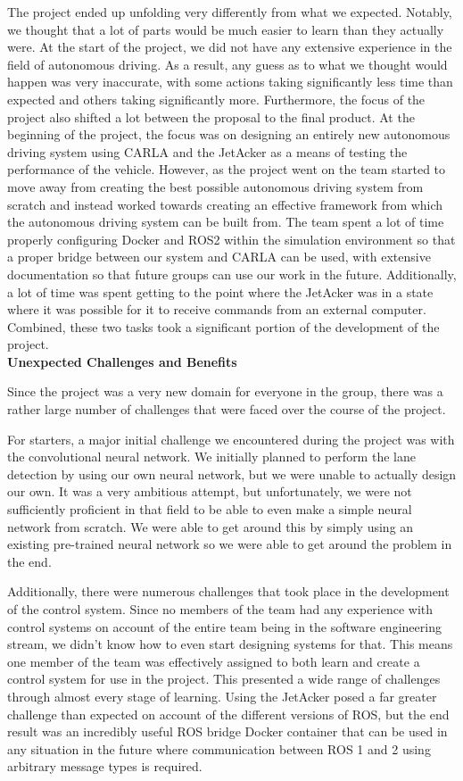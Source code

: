 \documentclass[titlepage, draft]{article}
\begin{document}
{The project ended up unfolding very differently from what we expected. Notably, we thought that a lot of parts would be much easier to learn than they actually were. At the start of the project, we did not have any extensive experience in the field of autonomous driving. As a result, any guess as to what we thought would happen was very inaccurate, with some actions taking significantly less time than expected and others taking significantly more. Furthermore, the focus of the project also shifted a lot between the proposal to the final product. At the beginning of the project, the focus was on designing an entirely new autonomous driving system using CARLA and the JetAcker as a means of testing the performance of the vehicle. However, as the project went on the team started to move away from creating the best possible autonomous driving system from scratch and instead worked towards creating an effective framework from which the autonomous driving system can be built from. The team spent a lot of time properly configuring Docker and ROS2 within the simulation environment so that a proper bridge between our system and CARLA can be used, with extensive documentation so that future groups can use our work in the future. Additionally, a lot of time was spent getting to the point where the JetAcker was in a state where it was possible for it to receive commands from an external computer. Combined, these two tasks took a significant portion of the development of the project.\\


\textbf{Unexpected Challenges and Benefits}

Since the project was a very new domain for everyone in the group, there was a rather large number of challenges that were faced over the course of the project.

For starters, a major initial challenge we encountered during the project was with the convolutional neural network. We initially planned to perform the lane detection by using our own neural network, but we were unable to actually design our own. It was a very ambitious attempt, but unfortunately, we were not sufficiently proficient in that field to be able to even make a simple neural network from scratch. We were able to get around this by simply using an existing pre-trained neural network so we were able to get around the problem in the end.

Additionally, there were numerous challenges that took place in the development of the control system. Since no members of the team had any experience with control systems on account of the entire team being in the software engineering stream, we didn't know how to even start designing systems for that. This means one member of the team was effectively assigned to both learn and create a control system for use in the project. This presented a wide range of challenges through almost every stage of learning. 
Using the JetAcker posed a far greater challenge than expected on account of the different versions of ROS, but the end result was an incredibly useful ROS bridge Docker container that can be used in any situation in the future where communication between ROS 1 and 2 using arbitrary message types is required. 

}
\end{document}
